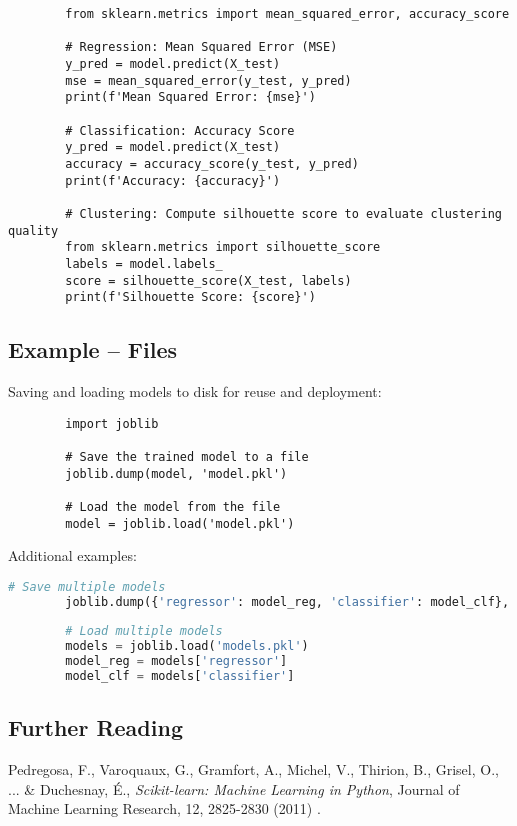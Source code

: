 	\begin{verbatim}
		from sklearn.metrics import mean_squared_error, accuracy_score
		
		# Regression: Mean Squared Error (MSE)
		y_pred = model.predict(X_test)
		mse = mean_squared_error(y_test, y_pred)
		print(f'Mean Squared Error: {mse}')
		
		# Classification: Accuracy Score
		y_pred = model.predict(X_test)
		accuracy = accuracy_score(y_test, y_pred)
		print(f'Accuracy: {accuracy}')
		
		# Clustering: Compute silhouette score to evaluate clustering quality
		from sklearn.metrics import silhouette_score
		labels = model.labels_
		score = silhouette_score(X_test, labels)
		print(f'Silhouette Score: {score}')
	\end{verbatim}


\subsection{Example -- Files}
Saving and loading models to disk for reuse and deployment:

\begin{framed}
	\begin{verbatim}
		import joblib
		
		# Save the trained model to a file
		joblib.dump(model, 'model.pkl')
		
		# Load the model from the file
		model = joblib.load('model.pkl')
	\end{verbatim}
\end{framed}

Additional examples:

\begin{framed}
	\begin{lstlisting}[language=python, basicstyle=\ttfamily\small]
		# Save multiple models
		joblib.dump({'regressor': model_reg, 'classifier': model_clf}, 'models.pkl')
		
		# Load multiple models
		models = joblib.load('models.pkl')
		model_reg = models['regressor']
		model_clf = models['classifier']
	\end{lstlisting}
\end{framed}



\subsection{Further Reading}
Pedregosa, F., Varoquaux, G., Gramfort, A., Michel, V., Thirion, B., Grisel, O., ... \& Duchesnay, É., \textit{Scikit-learn: Machine Learning in Python}, Journal of Machine Learning Research, 12, 2825-2830 (2011) \cite{pedregosa2011scikitlearn}.
